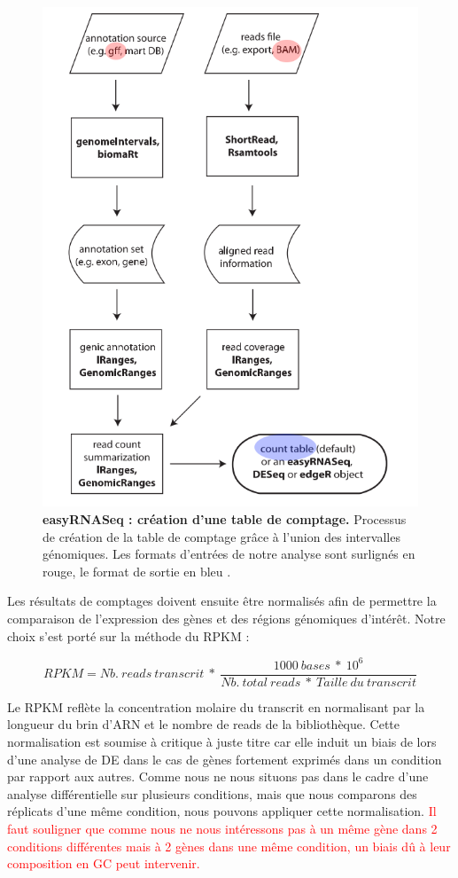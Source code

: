 \documentclass[12pt,a4paper]{report}
\begin{document}
\begin{onehalfspace}
\begin{figure}[ht]
\centerline{\includegraphics[scale=0.5]{figures/easyRNASeq.png}}
\caption{\textbf{easyRNASeq : création d'une table de comptage.} Processus de création de la table de comptage grâce à l'union des intervalles génomiques. Les formats d'entrées de notre analyse sont surlignés en rouge, le format de sortie en bleu \citep{Delhomme2012}.}
\label{fig:easyRNAseq} 
\end{figure}

Les résultats de comptages doivent ensuite être normalisés afin de permettre la comparaison de l'expression des gènes et des régions génomiques d'intérêt. Notre choix s'est porté sur la méthode du RPKM \citep{Mortazavi2008} :

\[RPKM = Nb.~reads~transcrit~*~\frac{1000~bases~*~10^6}{Nb.~total~reads~*~Taille~du~transcrit}\]

Le RPKM reflète la concentration molaire du transcrit en normalisant par la longueur du brin d'ARN et le nombre de reads de la bibliothèque. Cette normalisation est soumise à critique à juste titre \citep{Dillies2013} car elle induit un biais de lors d'une analyse de DE dans le cas de gènes fortement exprimés dans un condition par rapport aux autres. Comme nous ne nous situons pas dans le cadre d'une analyse différentielle sur plusieurs conditions, mais que nous comparons des réplicats d'une même condition, nous pouvons appliquer cette normalisation. \textcolor{red}{Il faut souligner que comme nous ne nous intéressons pas à un même gène dans 2 conditions différentes mais à 2 gènes dans une même condition, un biais dû à leur composition en GC peut intervenir.}


\end{onehalfspace}
\end{document}
